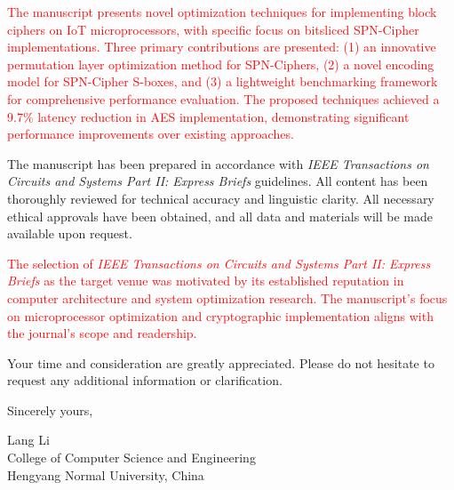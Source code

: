 \documentclass{article}
\begin{document}
\textcolor{red}{The manuscript presents novel optimization techniques for implementing block ciphers on IoT microprocessors, with specific focus on bitsliced SPN-Cipher implementations. Three primary contributions are presented: (1) an innovative permutation layer optimization method for SPN-Ciphers, (2) a novel encoding model for SPN-Cipher S-boxes, and (3) a lightweight benchmarking framework for comprehensive performance evaluation. The proposed techniques achieved a 9.7\% latency reduction in AES implementation, demonstrating significant performance improvements over existing approaches.}

The manuscript has been prepared in accordance with \textit{IEEE Transactions on Circuits and Systems Part II: Express Briefs} guidelines. All content has been thoroughly reviewed for technical accuracy and linguistic clarity. All necessary ethical approvals have been obtained, and all data and materials will be made available upon request.

\textcolor{red}{The selection of \textit{IEEE Transactions on Circuits and Systems Part II: Express Briefs} as the target venue was motivated by its established reputation in computer architecture and system optimization research. The manuscript's focus on microprocessor optimization and cryptographic implementation aligns with the journal's scope and readership.}

Your time and consideration are greatly appreciated. Please do not hesitate to request any additional information or clarification.

\bigskip %

Sincerely yours,

\vspace{20pt} %


Lang Li \\
College of Computer Science and Engineering\\
Hengyang Normal University, China \\
\end{document}
